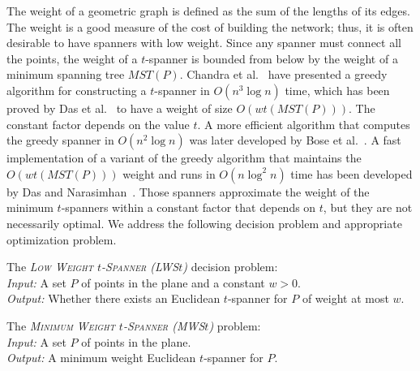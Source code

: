 \documentclass[a4paper]{llncs}
\begin{document}
The weight of a geometric graph is defined as the sum of the lengths of its edges. 
The weight is a good measure of the cost of building the network;
thus, it is often desirable to have spanners with low weight.
Since any spanner must connect all the points, the weight of a $t$-spanner is bounded 
from below by the weight of a minimum spanning tree $MST(P)$.
Chandra et al.~\cite{Chandra} have presented a greedy algorithm for constructing 
a $t$-spanner in $O(n^3 \log n)$ time, which has been proved 
by Das et al.~\cite{DasHN93,Das2} to have a weight of size $O(wt(MST(P)))$. 
The constant factor depends on the value $t$. 
A more efficient algorithm that computes the greedy spanner in $O(n^2\log n)$ 
was later developed by Bose et al.~\cite{BCFMS08}.
A fast implementation of a variant of the greedy algorithm that maintains the $O(wt(MST(P)))$ weight
and runs in $O(n \log^2 n)$ time has been developed by Das and Narasimhan~\cite{DN97}.
Those spanners approximate the weight of the minimum $t$-spanners within a constant factor that
depends on $t$, but they are not necessarily optimal.
We address the following decision problem and appropriate optimization problem.

\begin{myproblem}\label{prob:LWS$t$}
The \emph{\textsc{Low Weight $t$-Spanner} (LWS$t$)} decision problem:\\
\emph{Input:} A set $P$ of points in the plane and a constant $w>0$.\\
\emph{Output:} Whether there exists an Euclidean $t$-spanner for $P$ of weight at most $w$.
\end{myproblem}

\begin{myproblem}\label{prob:MWS$t$}
The \emph{\textsc{Minimum Weight $t$-Spanner} (MWS$t$)} problem:\\
\emph{Input:} A set $P$ of points in the plane.\\
\emph{Output:} A minimum weight Euclidean $t$-spanner for $P$.
\end{myproblem}
\end{document}
